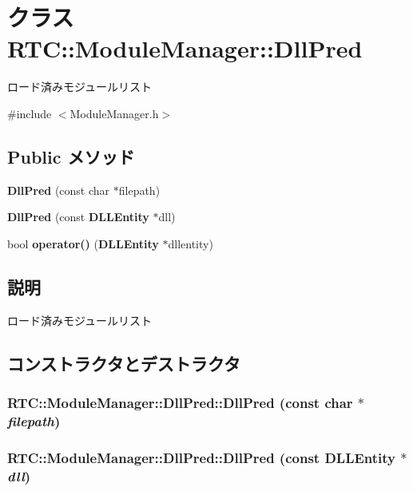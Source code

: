 \section{クラス RTC::ModuleManager::DllPred}
\label{classRTC_1_1ModuleManager_1_1DllPred}


ロード済みモジュールリスト  




{\ttfamily \#include $<$ModuleManager.h$>$}

\subsection*{Public メソッド}
\begin{DoxyCompactItemize}
\item 
{\bf DllPred} (const char $\ast$filepath)
\item 
{\bf DllPred} (const {\bf DLLEntity} $\ast$dll)
\item 
bool {\bf operator()} ({\bf DLLEntity} $\ast$dllentity)
\end{DoxyCompactItemize}


\subsection{説明}
ロード済みモジュールリスト 

\subsection{コンストラクタとデストラクタ}
\subsubsection[{DllPred}]{\setlength{\rightskip}{0pt plus 5cm}RTC::ModuleManager::DllPred::DllPred (const char $\ast$ {\em filepath})\hspace{0.3cm}{\ttfamily  [inline]}}\label{classRTC_1_1ModuleManager_1_1DllPred_a310047395705ffd885d7248607dadeba}
\subsubsection[{DllPred}]{\setlength{\rightskip}{0pt plus 5cm}RTC::ModuleManager::DllPred::DllPred (const {\bf DLLEntity} $\ast$ {\em dll})\hspace{0.3cm}{\ttfamily  [inline]}}\label{classRTC_1_1ModuleManager_1_1DllPred_a33b22d69fa04dbeafe0b8b8e207b59aa}


